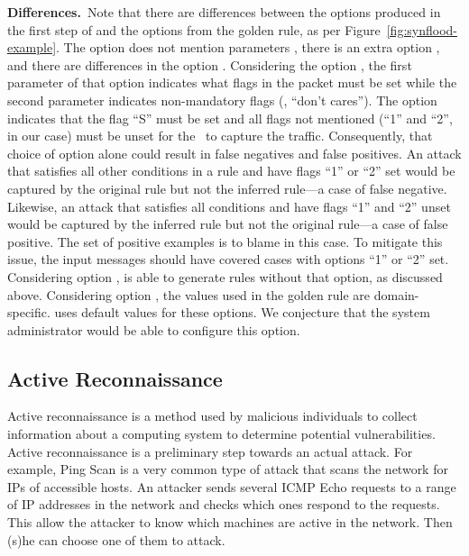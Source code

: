 \documentclass[sigconf,anonymous]{acmart}
\begin{document}
\noindent
\textbf{Differences.}~Note that there are differences between the
options produced in the first step of \tname{} and the options from
the golden rule, as per Figure~\ref{fig:synflood-example}. The option
 does not mention parameters , there is an
extra option , and there are differences in the option
. Considering the option , the first
parameter of that option indicates what flags in the packet must be
set while the second parameter indicates non-mandatory flags (\ie{},
``don't cares''). The option  indicates that the flag
``S'' must be set and all flags not mentioned (``1'' and ``2'', in our
case) must be unset for the \nids\ to capture the
traffic. Consequently, that choice of option alone could result in
false negatives and false positives. An attack that satisfies all
other conditions in a rule and have flags ``1'' or ``2'' set would be
captured by the original rule but not the inferred rule---a case of
false negative. Likewise, an attack that satisfies all conditions and
have flags ``1'' and ``2'' unset would be captured by the inferred
rule but not the original rule---a case of false positive. The set of
positive examples is to blame in this case. To mitigate this issue,
the input messages should have covered cases with options ``1'' or
``2'' set. Considering option , \tname{} is able
to generate rules without that option, as discussed above. Considering
option , the values used in the golden rule are
domain-specific. \tname{} uses default values for these options. We
conjecture that the system administrator would be able to configure
this option.


\subsection{Active Reconnaissance}



Active reconnaissance is a method used by malicious individuals to
collect information about a computing system to determine potential
vulnerabilities. Active reconnaissance is a preliminary step towards
an actual attack. For example, Ping Scan is a very common type of
attack that scans the network for IPs of accessible hosts. An attacker
sends several ICMP Echo requests to a range of IP addresses in the
network and checks which ones respond to the requests. This allow the
attacker to know which machines are active in the network. Then (s)he
can choose one of them to attack.
\end{document}
